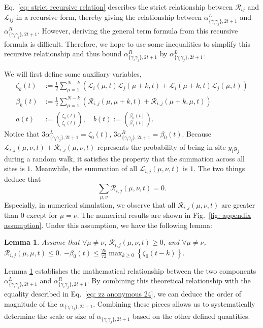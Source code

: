 \documentclass[journal=jctcce,a4paper,manuscript=article]{achemso}
\newtheorem{lemma}{Lemma}
\newcommand{\alpl}{\alpha_{\{\gamma_i\gamma_j\}, 2t+1}^{L}}
\newcommand{\alpr}{\alpha_{\{\gamma_i\gamma_j\}, 2t+1}^{R}}
\begin{document}
Eq.~\eqref{eq: strict recursive relation} describes the strict relationship
between $\mathscr{R}_{ij}$ and $\mathscr{L}_{ij}$ in a recursive form, thereby
giving the relationship between $\alpl$ and $\alpr$. However, deriving the
general term formula from this recursive formula is difficult. Therefore, we
hope to use some inequalities to simplify this recursive relationship and thus
bound $\alpr$ by $\alpl$.



We will first define some auxiliary variables,
\begin{align*}
  \zeta_k(t) & :=\frac{1}{2} \sum_{\mu=1}^{N-k}\left(\mathcal{L}_i(\mu, t) \mathcal{L}_j(\mu+k, t)+\mathcal{L}_i(\mu+k, t) \mathcal{L}_j(\mu, t)\right) \\
  \beta_k(t) & :=\frac{1}{2} \sum_{\mu=1}^{N-k}\left(\mathscr{R}_{i, j}(\mu, \mu+k, t)+\mathscr{R}_{i, j}(\mu+k, \mu, t)\right)                         \\
  a(t)       & :=\binom{\zeta_0(t)}{\zeta_1(t)}, \quad b(t):=\binom{\beta_0(t)}{\beta_1(t)}.
\end{align*}
Notice that $3\alpl = \zeta_0(t)$, $3\alpr = \beta_0(t)$. Because $\mathscr{L}_{i, j}(\mu, \nu, t) + \mathscr{R}_{i, j}(\mu, \nu, t)$ represents the probability of being in site $y_iy_j$ during a random walk, it satisfies the property that the summation across all sites is $1$. Meanwhile, the summation of all $\mathscr{L}_{i, j}(\mu, \nu, t)$ is $1$. The two things deduce that
\begin{equation}
  \sum_{\mu, \nu} \mathscr{R}_{i, j}(\mu, \nu, t) =0.
\end{equation}
Especially, in numerical simulation, we observe that all $\mathscr{R}_{i, j}(\mu, \nu, t)$ are greater than $0$ except for $\mu=\nu$. The numerical results are shown in Fig.~\ref{fig: appendix assumption}.
Under this assumption, we have the following lemma:
\begin{lemma}
  \label{theorem: relation between alpha L and alpha R 2}
  Assume that $\forall \mu\neq\nu$, $\mathscr{R}_{i, j}(\mu, \nu, t)\geq 0$, and $\forall \mu \neq \nu$, $\mathscr{R}_{i, j}(\mu, \mu, t)\leq 0$. $-\beta_0(t) \leq \frac{25}{72} \max_{k \geq 0}\left\{\zeta_0(t-k)\right\}$.
\end{lemma}

Lemma \ref{theorem: relation between alpha L and alpha R 2} establishes the
mathematical relationship between the two components $\alpl$ and $\alpr$. By
combining this theoretical relationship with the equality described in
Eq.~\eqref{eq: zz anonymous 24}, we can deduce the order of magnitude of the
$\alpha_{\{\gamma_i\gamma_j\}, 2t+1}$. Combining these pieces allows us to
systematically determine the scale or size of $\alpha_{\{\gamma_i\gamma_j\},
    2t+1}$ based on the other defined quantities.
\end{document}
